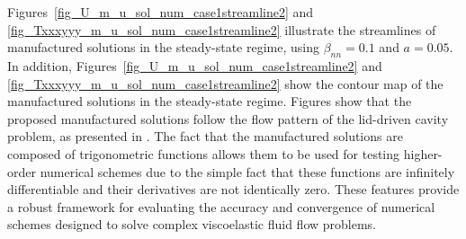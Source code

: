 \documentclass[preprint, 12pt]{elsarticle}
\begin{document}
Figures~\ref{fig_U_m_u_sol_num_case1streamline2} and \ref{fig_Txxxyyy_m_u_sol_num_case1streamline2} illustrate the streamlines of manufactured solutions in the steady-state regime, using $\beta_{nn}=0.1$ and $a = 0.05$. In addition, Figures~\ref{fig_U_m_u_sol_num_case1streamline2} and \ref{fig_Txxxyyy_m_u_sol_num_case1streamline2} show the contour map of the manufactured solutions in the steady-state regime. Figures show that the proposed manufactured solutions follow the flow pattern of the lid-driven cavity problem, as presented in \citet{bruneau20062d}. The fact that the manufactured solutions are composed of trigonometric functions allows them to be used for testing higher-order numerical schemes due to the simple fact that these functions are infinitely differentiable and their derivatives are not identically zero. These features provide a robust framework for evaluating the accuracy and convergence of numerical schemes designed to solve complex viscoelastic fluid flow problems.
\end{document}
